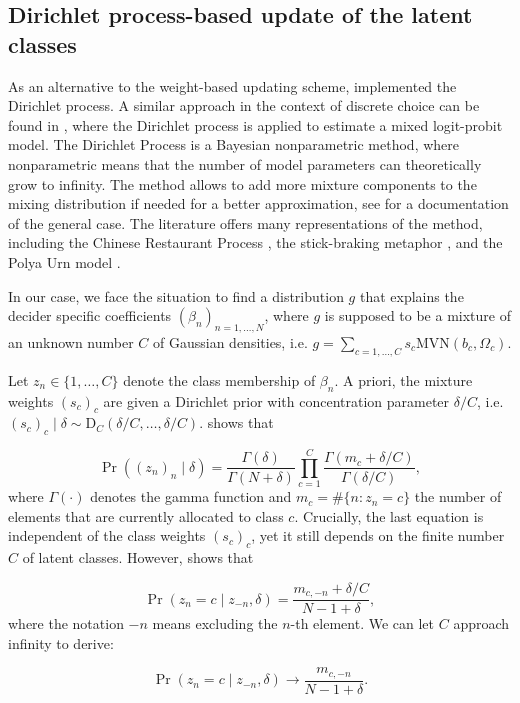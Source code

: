 \documentclass[article]{jss}
\begin{document}
\subsection{Dirichlet process-based update of the latent classes} \label{subsec:dp_update}

As an alternative to the weight-based updating scheme,  implemented the Dirichlet process. A similar approach in the context of discrete choice can be found in \cite{Burda:2008}, where the Dirichlet process is applied to estimate a mixed logit-probit model. The Dirichlet Process is a Bayesian nonparametric method, where nonparametric means that the number of model parameters can theoretically grow to infinity. The method allows to add more mixture components to the mixing distribution if needed for a better approximation, see \cite{Neal:2000} for a documentation of the general case. The literature offers many representations of the method, including the Chinese Restaurant Process \citep{Aldous:1985}, the stick-braking metaphor \citep{Sethuraman:1994}, and the Polya Urn model \citep{Blackwell:1973}.

In our case, we face the situation to find a distribution $g$ that explains the decider specific coefficients $(\beta_n)_{n = 1,\dots,N}$, where $g$ is supposed to be a mixture of an unknown number $C$ of Gaussian densities, i.e. $g = \sum_{c = 1,\dots,C} s_c \text{MVN}(b_c, \Omega_c)$.

Let $z_n \in \{1,\dots,C\}$ denote the class membership of $\beta_n$. A priori, the mixture weights $(s_c)_c$ are given a Dirichlet prior with concentration parameter $\delta/C$, i.e. $(s_c)_c \mid \delta \sim \text{D}_C(\delta/C,\dots,\delta/C)$. \cite{Rasmussen:2000} shows that

$$ \Pr((z_n)_n\mid \delta) = \frac{\Gamma(\delta)}{\Gamma(N+\delta)} \prod_{c=1}^C \frac{\Gamma(m_c + \delta/C)}{\Gamma(\delta/C)}, $$
where $\Gamma(\cdot)$ denotes the gamma function and $m_c = \#\{n:z_n = c\}$ the number of elements that are currently allocated to class $c$. Crucially, the last equation is independent of the class weights $(s_c)_c$, yet it still depends on the finite number $C$ of latent classes. However, \cite{Li:2019} shows that

$$ \Pr(z_n = c \mid z_{-n}, \delta) = \frac{m_{c,-n} + \delta/C}{N-1+\delta},$$
where the notation $-n$ means excluding the $n$-th element. We can let $C$ approach infinity to derive:

$$ \Pr(z_n = c \mid z_{-n}, \delta) \to \frac{m_{c,-n}}{N-1+\delta}. $$
\end{document}
